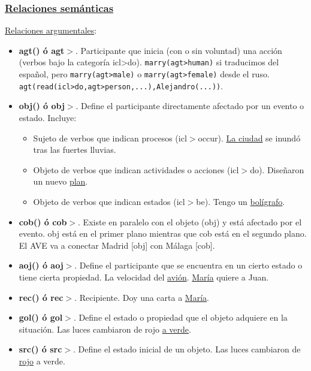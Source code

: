 \documentclass{article}
\begin{document}
\begin{multicols*}{3}
\subsubsection*{\underline{Relaciones semánticas}}

\underline{Relaciones argumentales}:

\begin{itemize}[itemsep=0pt, parsep=0pt, leftmargin=1em]
    \item \textbf{agt() ó agt$>$}. Participante que inicia (con o sin voluntad)
    una acción (verbos bajo la categoría icl>do). \verb+marry(agt>human)+ si traducimos del español, pero \verb+marry(agt>male)+ o \verb+marry(agt>female)+ desde el ruso. \verb+agt(read(icl>do,agt>person,...),Alejandro(...))+.
    \item \textbf{obj() ó obj$>$}. Define el participante directamente afectado por un evento o estado. Incluye:
    \begin{itemize}[itemsep=0pt, parsep=0pt, leftmargin=1em]
        \item Sujeto de verbos que indican procesos (icl$>$occur). \underline{La ciudad} se inundó tras las fuertes lluvias.
        \item Objeto de verbos que indican actividades o acciones (icl$>$do). Diseñaron un nuevo \underline{plan}.
        \item Objeto de verbos que indican estados (icl$>$be). Tengo un \underline{bolígrafo}.
    \end{itemize}
    \item \textbf{cob() ó cob$>$}. Existe en paralelo con el objeto (obj) y está afectado por el evento. obj está en el primer plano mientras que cob está en el segundo plano. El AVE va a conectar Madrid [obj] con Málaga [cob].
    \item \textbf{aoj() ó aoj$>$}. Define el participante que se encuentra en un cierto estado o tiene cierta propiedad. La velocidad del \underline{avión}. \underline{María} quiere a Juan.
    \item \textbf{rec() ó rec$>$}. Recipiente. Doy una carta a \underline{María}.
    \item \textbf{gol() ó gol$>$}. Define el estado o propiedad que el objeto adquiere en la situación. Las luces cambiaron de rojo \underline{a verde}.
    \item \textbf{src() ó src$>$}. Define el estado inicial de un objeto. Las luces cambiaron de \underline{rojo} a verde.
\end{itemize}


\end{multicols*}
\end{document}
